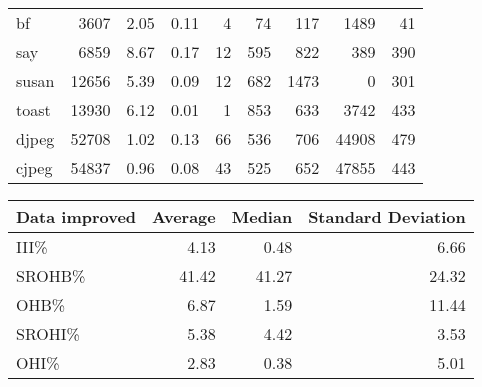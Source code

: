 \begin{tabular}{lrrrrrrrr}
 bf             &           3607 &     2.05 &   0.11 &    4 &     74 &          117 &  1489 &    41 \\
 say            &           6859 &     8.67 &   0.17 &   12 &    595 &          822 &   389 &   390 \\
 susan          &          12656 &     5.39 &   0.09 &   12 &    682 &         1473 &     0 &   301 \\
 toast          &          13930 &     6.12 &   0.01 &    1 &    853 &          633 &  3742 &   433 \\
 djpeg          &          52708 &     1.02 &   0.13 &   66 &    536 &          706 & 44908 &   479 \\
 cjpeg          &          54837 &     0.96 &   0.08 &   43 &    525 &          652 & 47855 &   443 \\
\hline
\end{tabular}\begin{tabular}{lrrr}
\hline
 Data improved   &   Average &   Median &   Standard Deviation \\
\hline
 III\%            &      4.13 &     0.48 &                 6.66 \\
 SROHB\%          &     41.42 &    41.27 &                24.32 \\
 OHB\%            &      6.87 &     1.59 &                11.44 \\
 SROHI\%          &      5.38 &     4.42 &                 3.53 \\
 OHI\%            &      2.83 &     0.38 &                 5.01 \\
\hline
\end{tabular}